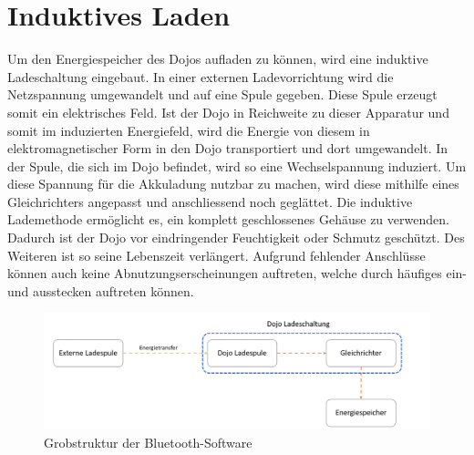 \section{Induktives Laden}
Um den Energiespeicher des Dojos aufladen zu können, wird eine induktive Ladeschaltung eingebaut. In einer externen Ladevorrichtung wird die Netzspannung umgewandelt und auf eine Spule gegeben. Diese Spule erzeugt somit ein elektrisches Feld. Ist der Dojo in Reichweite zu dieser Apparatur und somit im induzierten Energiefeld, wird die Energie von diesem in elektromagnetischer Form in den Dojo transportiert und dort umgewandelt. In der Spule, die sich im Dojo befindet, wird so eine Wechselspannung induziert. Um diese Spannung für die Akkuladung nutzbar zu machen, wird diese mithilfe eines Gleichrichters angepasst und anschliessend noch geglättet. Die induktive Lademethode ermöglicht es, ein komplett geschlossenes Gehäuse zu verwenden. Dadurch ist der Dojo vor eindringender Feuchtigkeit oder Schmutz geschützt. Des Weiteren ist so seine Lebenszeit verlängert. Aufgrund fehlender Anschlüsse können auch keine Abnutzungserscheinungen auftreten, welche durch häufiges ein- und ausstecken auftreten können. 

\begin{figure}[H]
\begin{center}
	\includegraphics[width=160mm]{data/Induktion.png}
	\caption{Grobstruktur der Bluetooth-Software} %
	\label{fig:first_layer}
\end{center}
\end{figure}